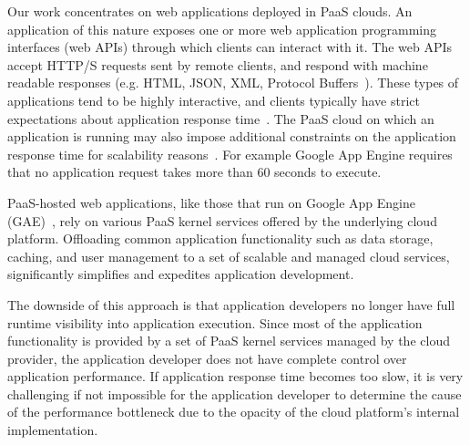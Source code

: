 

Our work concentrates on web
applications deployed in PaaS clouds. An application of this nature exposes
one or more web application programming interfaces (web APIs) through which
clients can interact with it. The web APIs accept HTTP/S requests sent by
remote clients, and respond with machine readable responses (e.g. HTML, JSON,
XML, Protocol Buffers~\cite{protobuff}). These types of applications tend to be highly
interactive, and clients typically have strict expectations about application
response time~\cite{latency-matters}. 
The PaaS cloud on
which an application is running may also impose additional constraints on the
application response time for scalability
reasons~\cite{azure-limits,gae-limits}.  For example Google App Engine
requires that no application request takes more than 60 seconds to execute.

PaaS-hosted web applications, like those that run on Google App Engine
(GAE)~\cite{gae},  
rely on various PaaS kernel services offered by the underlying
cloud platform. 
Offloading common application functionality such as data storage, caching,
and user management to a set of scalable and
managed cloud services, significantly simplifies and expedites
application development.

The downside of this approach is that application developers no longer have full runtime visibility
into application execution. Since most of the application functionality is provided by a set 
of PaaS kernel services managed by the cloud provider, the application
developer does not have complete control over application performance. If application 
response time becomes too slow, it is very challenging if not impossible
for the application developer to determine
the cause of the performance bottleneck due to the opacity of the cloud
platform's internal implementation. 

